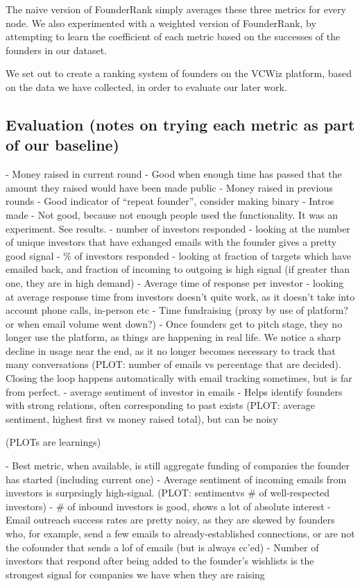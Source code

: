 The naive version of FounderRank simply averages these three metrics for every node. We also experimented with a weighted version of FounderRank, by attempting to learn the coefficient of each metric based on the successes of the founders in our dataset.

We set out to create a ranking system of founders on the VCWiz platform, based on the data we have collected, in order to evaluate our later work.

\subsection{Evaluation (notes on trying each metric as part of our baseline)}
- Money raised in current round
  - Good when enough time has passed that the amount they raised would have been made public
- Money raised in previous rounds
  - Good indicator of ``repeat founder'', consider making binary
- Intros made
  - Not good, because not enough people used the functionality. It was an experiment. See results.
- number of investors responded
  - looking at the number of unique investors that have exhanged emails with the founder gives a pretty good signal
- \% of investors responded
  - looking at fraction of targets which have emailed back, and fraction of incoming to outgoing is high signal (if greater than one, they are in high demand)
- Average time of response per investor
  - looking at average response time from investors doesn't quite work, as it doesn't take into account phone calls, in-person etc
- Time fundraising (proxy by use of platform? or when email volume went down?)
  - Once founders get to pitch stage, they no longer use the platform, as things are happening in real life. We notice a sharp decline in usage near the end, as it no longer becomes necessary to track that many conversations (PLOT: number of emails vs percentage that are decided). Closing the loop happens automatically with email tracking sometimes, but is far from perfect.
- average sentiment of investor in emails
  - Helps identify founders with strong relations, often corresponding to past exists (PLOT: average sentiment, highest first vs money raised total), but can be noisy

(PLOTs are learnings)

- Best metric, when available, is still aggregate funding of companies the founder has started (including current one)
- Average sentiment of incoming emails from investors is surprsingly high-signal. (PLOT: sentimentvs \# of well-respected investors)
- \# of inbound investors is good, shows a lot of absolute interest
- Email outreach success rates are pretty noisy, as they  are skewed by founders who, for example, send a few emails to already-established connections, or are not the cofounder that sends a lof of emails (but is always cc'ed)
- Number of investors that respond after being added to the founder's wishlists is the strongest signal for companies we have when they are raising

